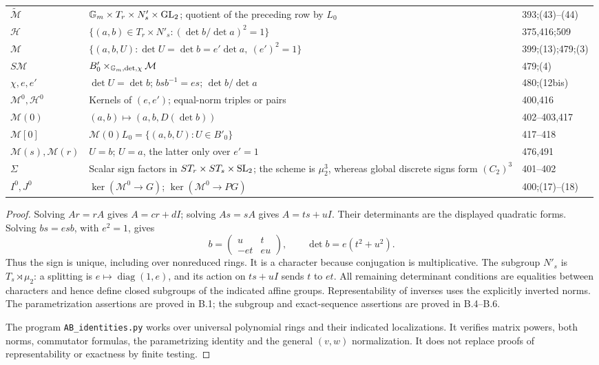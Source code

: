 \begin{longtable}{p{.16\linewidth}p{.56\linewidth}p{.18\linewidth}}
$\widetilde{\mathcal M}$&$\mathbb G_m\times T_r\times N'_s\times\operatorname{GL}_2$; quotient of the preceding row by $L_0$&393;(43)--(44)\\
$\mathcal H$&$\{(a,b)\in T_r\times N'_s:(\det b/\det a)^2=1\}$&375,416;509\\
$\mathcal M$&$\{(a,b,U):\det U=\det b=e'\det a,\ (e')^2=1\}$&399;(13);479;(3)\\
$S\mathcal M$&$B'_0\times_{\mathbb G_m,\det,\chi}\mathcal M$&479;(4)\\
$\chi,e,e'$&$\det U=\det b$; $b s b^{-1}=e s$; $\det b/\det a$&480;(12bis)\\
$\mathcal M^0,\mathcal H^0$&Kernels of $(e,e')$; equal-norm triples or pairs&400,416\\
$\mathcal M(0)$&$(a,b)\mapsto(a,b,D(\det b))$&402--403,417\\
$\mathcal M[0]$&$\mathcal M(0)L_0=\{(a,b,U):U\in B'_0\}$&417--418\\
$\mathcal M(s),\mathcal M(r)$&$U=b$; $U=a$, the latter only over $e'=1$&476,491\\
$\Sigma$&Scalar sign factors in $ST_r\times ST_s\times\operatorname{SL}_2$;
 the scheme is $\mu_2^3$, whereas global discrete signs form $(C_2)^3$&401--402\\
$I^0,J^0$&$\ker(\mathcal M^0\to G)$;
 $\ker(\mathcal M^0\to PG)$&400;(17)--(18)\\\bottomrule
\end{longtable}
\begin{proof}
Solving $Ar=rA$ gives $A=cr+dI$; solving $As=sA$ gives $A=ts+uI$.
Their determinants are the displayed quadratic forms. Solving
$bs=e sb$, with $e^2=1$, gives
\[
 b=\begin{pmatrix}u&t\\-et&eu\end{pmatrix},\qquad
 \det b=e(t^2+u^2).
\]
Thus the sign is unique, including over nonreduced rings. It is a
character because conjugation is multiplicative. The subgroup $N'_s$
is $T_s\rtimes\mu_2$: a splitting is $e\mapsto\operatorname{diag}(1,e)$,
and its action on $ts+uI$ sends $t$ to $et$. All remaining determinant
conditions are equalities between characters and hence define closed
subgroups of the indicated affine groups. Representability of inverses
uses the explicitly inverted norms. The parametrization assertions are
proved in B.1; the subgroup and exact-sequence assertions are proved in
B.4--B.6.

The program \texttt{AB\_identities.py} works over universal polynomial
rings and their indicated localizations. It verifies matrix powers,
both norms, commutator formulas, the parametrizing identity and the
general $(v,w)$ normalization. It does not replace proofs of
representability or exactness by finite testing.
\end{proof}

